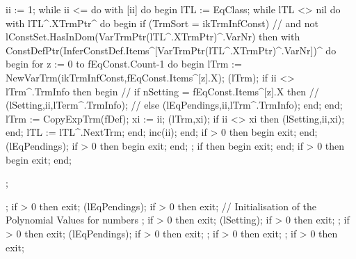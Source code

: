    ii := 1;
   while ii <=  do
      with [ii] do
   begin
      lTL := EqClass;
      while lTL <> nil do
         with lTL^.XTrmPtr^ do
      begin
         if (TrmSort = ikTrmInfConst)
               // and not lConstSet.HasInDom(VarTrmPtr(lTL^.XTrmPtr)^.VarNr)
         then
            with ConstDefPtr(InferConstDef.Items^[VarTrmPtr(lTL^.XTrmPtr)^.VarNr])^ do
         begin
            for z := 0 to fEqConst.Count-1 do
            begin
               lTrm := NewVarTrm(ikTrmInfConst,fEqConst.Items^[z].X);
               (lTrm);
               if ii <> lTrm^.TrmInfo then
               begin
                  // if nSetting = fEqConst.Items^[z].X then
                  //    (lSetting,ii,lTerm^.TrmInfo);
                  // else
                  (lEqPendings,ii,lTrm^.TrmInfo);
               end;
            end;
            lTrm := CopyExpTrm(fDef);
            xi := ii;
            (lTrm,xi);
            if ii <> xi then
               (lSetting,ii,xi);
         end;
         lTL := lTL^.NextTrm;
      end;
      inc(ii);
   end;
   if  > 0 then
   begin
      exit;
   end;
   (lEqPendings);
   if  > 0 then
   begin
      exit;
   end;
   ;
   if  then
   begin
      exit;
   end;
   if  > 0 then
   begin
      exit;
   end;
   
   ;
   
   ;
   if  > 0 then exit;
   (lEqPendings);
   if  > 0 then exit;
   // Initialisation of the Polynomial Values for numbers
   ;
   if  > 0 then exit;
   (lSetting);
   if  > 0 then exit;
   ;
   if  > 0 then exit;
   (lEqPendings);
   if  > 0 then exit;
   ;
   if  > 0 then exit;
   ;
   if  > 0 then exit;
   
